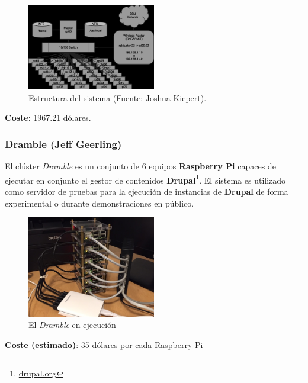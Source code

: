
\begin{figure}[H]
\centering
\includegraphics[width=0.5\textwidth]{Chapter1/Figures/structure.png}
\caption{Estructura del sistema (Fuente: Joshua Kiepert).}
\label{kiepert:structure}
\end{figure}

\textbf{Coste}: 1967.21 dólares.


\subsubsection{Dramble (Jeff Geerling)}

El clúster \textit{Dramble} es un conjunto de 6 equipos \textbf{Raspberry Pi} capaces de ejecutar en conjunto el gestor de contenidos \textbf{Drupal}\footnote{\href{https://www.drupal.org/}{drupal.org}}. El sistema es utilizado como servidor de pruebas para la ejecución de instancias de \textbf{Drupal} de forma experimental o durante demonstraciones en público\cite{geerlingraspberry}.

\begin{figure}[H]
\centering
\includegraphics[width=0.5\textwidth]{Chapters/Chapter1/Figures/raspberry-pi-dramble-cluster-wired.jpg}
\caption{El \textit{Dramble} en ejecución}
\label{geerling:dramble}
\end{figure}


\textbf{Coste (estimado)}: 35 dólares por cada Raspberry Pi\citationneeded

